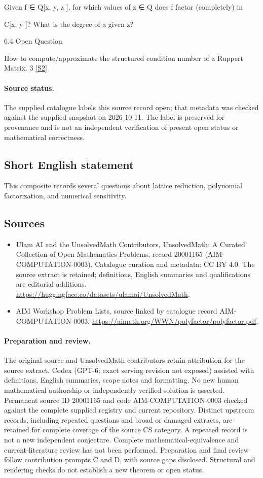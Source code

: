 \documentclass[11pt]{article}
\newcommand{\sref}[2]{\hyperlink{source:#1:#2}{[S#2]}}
\begin{document}
Given f ∈ Q[x, y, z ], for which values of z ∈ Q does f factor (completely) in

C[x, y ]? What is the degree of a given z?

6.4 Open Question

How to compute/approximate the structured condition number of a Ruppert Matrix. 3 \sref{20001165}{2}
\paragraph{Source status.}
The supplied catalogue labels this source record open; that metadata was checked against the supplied snapshot on 2026-10-11. The label is preserved for provenance and is not an independent verification of present open status or mathematical correctness.
\subsection{Short English statement}
This composite records several questions about lattice reduction, polynomial factorization, and numerical sensitivity.
\subsection{Sources}
\begin{itemize}
\item[\hypertarget{source:20001165:1}{S1}] Ulam AI and the UnsolvedMath Contributors, UnsolvedMath: A Curated Collection of Open Mathematics Problems, record 20001165 (AIM-COMPUTATION-0003). Catalogue curation and metadata: CC BY 4.0. The source extract is retained; definitions, English summaries and qualifications are editorial additions.
\url{https://huggingface.co/datasets/ulamai/UnsolvedMath}.
\item[\hypertarget{source:20001165:2}{S2}] AIM Workshop Problem Lists, source linked by catalogue record AIM-COMPUTATION-0003.
\url{https://aimath.org/WWN/polyfactor/polyfactor.pdf}.
\end{itemize}
\paragraph{Preparation and review.}
The original source and UnsolvedMath contributors retain attribution for the source extract. Codex (GPT-6; exact serving revision not exposed) assisted with definitions, English summaries, scope notes and formatting. No new human mathematical authorship or independently verified solution is asserted. Permanent source ID 20001165 and code AIM-COMPUTATION-0003 checked against the complete supplied registry and current repository. Distinct upstream records, including repeated questions and broad or damaged extracts, are retained for complete coverage of the source CS category. A repeated record is not a new independent conjecture. Complete mathematical-equivalence and current-literature review has not been performed. Preparation and final review follow contribution prompts C and D, with source gaps disclosed. Structural and rendering checks do not establish a new theorem or open status.
\label{end:20001165}
\end{document}
